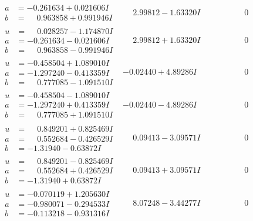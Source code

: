 \documentclass[1p]{elsarticle_modified}
\theoremstyle{definition}
\begin{document}
$$\begin{array}{c|c|c}
\begin{aligned}
a &= -0.261634 + 0.021606 I \\
b &= \phantom{-}0.963858 + 0.991946 I\end{aligned}
 & \phantom{-}2.99812 - 1.63320 I & \phantom{-0.000000 } 0 \\ \hline\begin{aligned}
u &= \phantom{-}0.028257 - 1.174870 I \\
a &= -0.261634 - 0.021606 I \\
b &= \phantom{-}0.963858 - 0.991946 I\end{aligned}
 & \phantom{-}2.99812 + 1.63320 I & \phantom{-0.000000 } 0 \\ \hline\begin{aligned}
u &= -0.458504 + 1.089010 I \\
a &= -1.297240 - 0.413359 I \\
b &= \phantom{-}0.777085 - 1.091510 I\end{aligned}
 & -0.02440 + 4.89286 I & \phantom{-0.000000 } 0 \\ \hline\begin{aligned}
u &= -0.458504 - 1.089010 I \\
a &= -1.297240 + 0.413359 I \\
b &= \phantom{-}0.777085 + 1.091510 I\end{aligned}
 & -0.02440 - 4.89286 I & \phantom{-0.000000 } 0 \\ \hline\begin{aligned}
u &= \phantom{-}0.849201 + 0.825469 I \\
a &= \phantom{-}0.552684 - 0.426529 I \\
b &= -1.31940 - 0.63872 I\end{aligned}
 & \phantom{-}0.09413 - 3.09571 I & \phantom{-0.000000 } 0 \\ \hline\begin{aligned}
u &= \phantom{-}0.849201 - 0.825469 I \\
a &= \phantom{-}0.552684 + 0.426529 I \\
b &= -1.31940 + 0.63872 I\end{aligned}
 & \phantom{-}0.09413 + 3.09571 I & \phantom{-0.000000 } 0 \\ \hline\begin{aligned}
u &= -0.070119 + 1.205630 I \\
a &= -0.980071 - 0.294533 I \\
b &= -0.113218 - 0.931316 I\end{aligned}
 & \phantom{-}8.07248 - 3.44277 I & \phantom{-0.000000 } 0 \\ \hline\begin{aligned}

\end{aligned}
\end{array}$$
\end{document}

